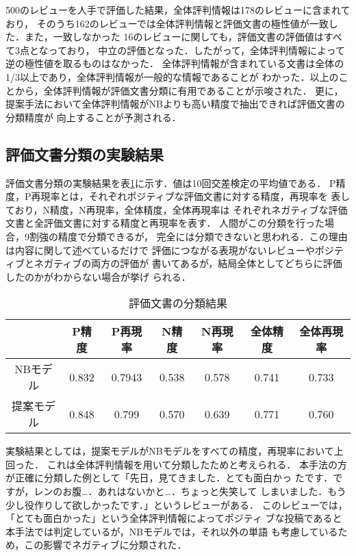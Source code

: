 \documentclass[japanese]{jnlp_1.3c}
\begin{document}
500のレビューを人手で評価した結果，全体評判情報は178のレビューに含まれており，
そのうち162のレビューでは全体評判情報と評価文書の極性値が一致した．また，一致しなかった
16のレビューに関しても，評価文書の評価値はすべて3点となっており，
中立の評価となった．したがって，全体評判情報によって逆の極性値を取るものはなかった．
全体評判情報が含まれている文書は全体の1/3以上であり，全体評判情報が一般的な情報であることが
わかった．以上のことから，全体評判情報が評価文書分類に有用であることが示唆された．
更に，提案手法において全体評判情報がNBよりも高い精度で抽出できれば評価文書の分類精度が
向上することが予測される．

\subsection{評価文書分類の実験結果}
評価文書分類の実験結果を表\ref{result}に示す．値は10回交差検定の平均値である．
P精度，P再現率とは，それぞれポジティブな評価文書に対する精度，再現率を
表しており，N精度，N再現率，全体精度，全体再現率は
それぞれネガティブな評価文書と全評価文書に対する精度と再現率を表す．
人間がこの分類を行った場合，9割強の精度で分類できるが，
完全には分類できないと思われる．この理由は内容に関して述べているだけで
評価につながる表現がないレビューやポジティブとネガティブの両方の評価が
書いてあるが，結局全体としてどちらに評価したのかがわからない場合が挙げ
られる．

\begin{table}[b]
\caption{評価文書の分類結果}
\label{result}
\begin{center}
\begin{tabular}{|c|c|c|c|c||c|c|} \hline
  & P精度 & P再現率 & N精度 & N再現率 &全体精度 & 全体再現率\\ \hline
NBモデル & 0.832 & 0.7943 & 0.538 & 0.578 & 0.741 & 0.733\\ \hline
提案モデル  & 0.848 & 0.799 & 0.570 & 0.639 & 0.771 & 0.760\\ \hline
\end{tabular}
\end{center}
\end{table}


実験結果としては，提案モデルがNBモデルをすべての精度，再現率において上回った．
これは全体評判情報を用いて分類したためと考えられる．
本手法の方が正確に分類した例として「先日，見てきました．とても面白かっ
たです．ですが，レンのお腹…．あれはないかと…．ちょっと失笑して
しまいました．もう少し役作りして欲しかったです．」というレビューがある．
このレビューでは，「とても面白かった」という全体評判情報によってポジティ
ブな投稿であると本手法では判定しているが，NBモデルでは，それ以外の単語
も考慮しているため，この影響でネガティブに分類された．
\end{document}
